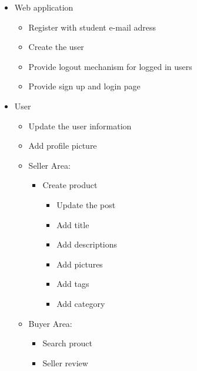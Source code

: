     \begin{itemize}
        \item Web application
        \begin{itemize}
            \item Register with student e-mail adress
            \item Create the user
            \item Provide logout mechanism for logged in users
            \item Provide sign up and login page
        \end{itemize}
        \item User
        \begin{itemize}
            \item Update the user information
            \item Add profile picture
            \item Seller Area:
            \begin{itemize}
                \item Create product
                \begin{itemize}
                    \item Update the post
                    \item Add title
                    \item Add descriptions
                    \item Add pictures
                    \item Add tags
                    \item Add category
                \end{itemize}
            \end{itemize} 
            \item Buyer Area:
            \begin{itemize} 
                \item Search prouct
                \item Seller review
            \end{itemize}     
        \end{itemize}
    \end{itemize}